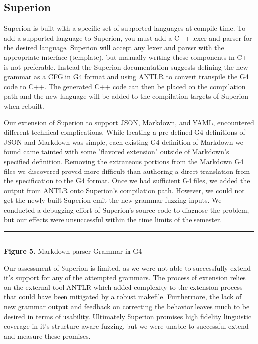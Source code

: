 \documentclass[12pt]{diazessay}
\begin{document}
\subsection*{Superion}

Superion is built with a specific set of supported languages at compile time.
To add a supported language to Superion, you must add a C++ lexer and parser for the desired language.
Superion will accept any lexer and parser with the appropriate interface (template), but manually writing these components in C++ is not preferable.
Instead the Superion documentation suggests defining the new grammar as a CFG in G4 format and using ANTLR\cite{parr2013definitive} to convert transpile the G4 code to C++.
The generated C++ code can then be placed on the compilation path and the new language will be added to the compilation targets of Superion when rebuilt.

Our extension of Superion to support JSON, Markdown, and YAML, encountered different technical complications.
While locating a pre-defined G4 definitions of JSON and Markdown was simple, each existing G4 definition of Markdown we found came tainted with some "flavored extension" outside of Markdown's specified definition.
Removing the extraneous portions from the Markdown G4 files we discovered proved more difficult than authoring a direct translation from the specification to the G4 format.
Once we had sufficient G4 files, we added the output from ANTLR onto Superion's compilation path.
However, we could not get the newly built Superion emit the new grammar fuzzing inputs.
We conducted a debugging effort of Superion's source code to diagnose the problem, but our effects were unsuccessful within the time limits of the semester.

\vspace{10mm}
\hrule height 0.4mm
\begingroup \fontsize{10pt}{10pt} \selectfont \begin{alltt}

\end{alltt} \vspace{-6mm} \endgroup \hrule height 0.4mm
\vspace{6mm}
\centerline{\textbf{Figure 5.} Markdown parser Grammar in G4}
\vspace{6mm}

Our assessment of Superion is limited, as we were not able to successfully extend it's support for any of the attempted grammars.
The process of extension relies on the external tool ANTLR which added complexity to the extension process that could have been mitigated by a robust makefile.
Furthermore, the lack of new grammar output and feedback on correcting the behavior leaves much to be desired in terms of usability.
Ultimately Superion promises high fidelity linguistic coverage in it's structure-aware fuzzing, but we were unable to successful extend and measure these promises.
\end{document}
